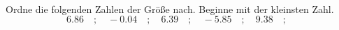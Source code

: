 \begin{aufgabe} ~ \\ 
Ordne die folgenden Zahlen der Gr\"o\ss{}e nach. Beginne mit der kleinsten Zahl.\[6.86\quad ; \quad-0.04\quad ; \quad6.39\quad ; \quad-5.85\quad ; \quad9.38\quad ; \quad\]\end{aufgabe} 
